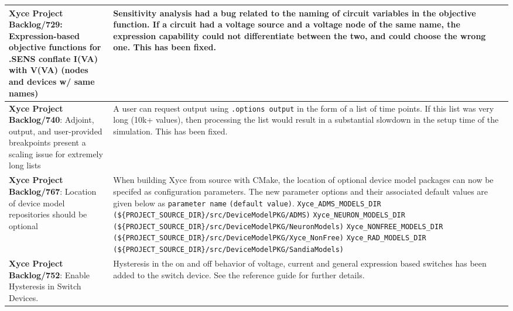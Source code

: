 {\begin{longtable}[h] {>{\raggedright\small}m{2in}|>{\raggedright\let\\\tabularnewline\small}m{3.5in}}
\textbf{Xyce Project Backlog/729}: 
Expression-based objective functions for .SENS conflate I(VA) with V(VA) (nodes and devices w/ same names)
& Sensitivity analysis had a bug related to the naming of circuit variables in the objective function.
If a circuit had a voltage source and a voltage node of the same name, the expression capability could not differentiate between the two, and could choose the wrong one.  This has been fixed. \\ \hline

\textbf{Xyce Project Backlog/740}: Adjoint, output, and user-provided breakpoints present a scaling issue for
extremely long lists & A user can request output using \texttt{.options output}
in the form of a list of time points.  If this list was very long (10k+ values),
then processing the list would result in a substantial slowdown in the setup time of the 
simulation.  This has been fixed. \\ \hline

\textbf{Xyce Project Backlog/767}: Location of device model repositories 
should be optional & When building Xyce from source with CMake, the 
location of optional device model packages can now be specifed as 
configuration parameters. The new parameter options and their 
associated default values are given below as \texttt{parameter name} 
\texttt{(default value)}. \newline
\texttt{Xyce\_ADMS\_MODELS\_DIR} \texttt{(\$\{PROJECT\_SOURCE\_DIR\}/src/DeviceModelPKG/ADMS)} \newline
\texttt{Xyce\_NEURON\_MODELS\_DIR} \texttt{(\$\{PROJECT\_SOURCE\_DIR\}/src/DeviceModelPKG/NeuronModels)} \newline
\texttt{Xyce\_NONFREE\_MODELS\_DIR} \texttt{(\$\{PROJECT\_SOURCE\_DIR\}/src/DeviceModelPKG/Xyce\_NonFree)} \newline
\texttt{Xyce\_RAD\_MODELS\_DIR} \texttt{(\$\{PROJECT\_SOURCE\_DIR\}/src/DeviceModelPKG/SandiaModels)} \newline
\\ \hline

\textbf{Xyce Project Backlog/752}: Enable Hysteresis in Switch Devices.
&  Hysteresis in the on and off behavior of voltage, current and general 
expression based switches has been added to the switch device.  See the 
reference guide for further details. 
\\\hline


\end{longtable}
}
